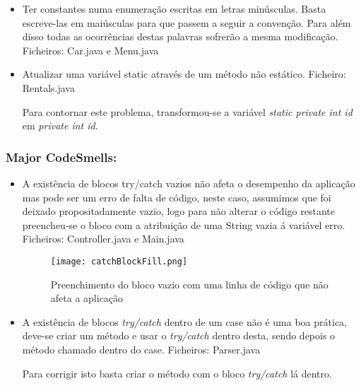 \begin{itemize}
\item Ter constantes numa enumeração escritas em letras minúsculas. Basta escreve-las em maiúsculas para que passem a seguir a convenção. Para além disso todas as ocorrências destas palavras sofrerão a mesma modificação.
 Ficheiros: Car.java e Menu.java\newline
\end{itemize}

\begin{itemize}
\item Atualizar uma variável static através de um método não estático.\newline
 Ficheiro: Rentals.java\newline
\par Para contornar este problema, transformou-se a variável \textit{static private int id} em \textit{private int id}.
\end{itemize}




\subsubsection{Major CodeSmells:}

\begin{itemize}
\item A existência de blocos try/catch vazios não afeta o desempenho da aplicação mas pode ser um erro de falta de código, neste caso, assumimos que foi deixado propositadamente vazio, logo para não alterar o código restante preencheu-se o bloco com a atribuição de uma String vazia á variável erro.\newline
 Ficheiros: Controller.java e Main.java\newline

 \begin{figure}[H]

  \centering

  \texttt{[image: catchBlockFill.png]}

  \caption {Preenchimento do bloco vazio com uma linha de código que não afeta a aplicação}

  \label {fig11}

\end{figure}
\end{itemize}

\begin{itemize}
\item A existência de blocos \textit{try/catch} dentro de um case não é uma boa prática, deve-se criar um método e usar o \textit{try/catch} dentro desta, sendo depois o método chamado dentro do case.\newline
 Ficheiros: Parser.java\newline
\par Para corrigir isto basta criar o método com o bloco \textit{try/catch} lá dentro.
\end{itemize}

